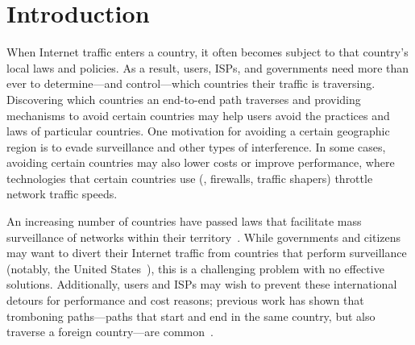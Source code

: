 \section{Introduction}
\label{intro}

When Internet traffic enters a country, it often becomes subject to that country's
local laws and policies.  As a result, users, ISPs, and governments need
more than ever to determine---and control---which countries their traffic is
traversing.  Discovering which countries an end-to-end path traverses and
providing mechanisms to avoid certain countries may help users avoid the
 practices and laws of particular countries. One motivation for avoiding a certain 
geographic region is to evade surveillance and other types of interference.  In some
cases, avoiding certain countries may also lower costs or improve performance,
where technologies that certain countries use (\eg, firewalls, traffic
shapers) throttle network traffic speeds. 

An increasing number of countries have passed laws that facilitate mass
surveillance of networks within their territory~\cite{france_surveillance,netherlands_surveillance,kazak_surveillance,uk_bill}. While governments and
citizens may want to divert their Internet traffic from countries that
perform surveillance (notably, the United States~\cite{russia_secure_internet,routing_errors,dte}), this is a challenging problem with no effective 
solutions.   Additionally, users and ISPs may wish to prevent these international detours for
performance and cost reasons; previous work has shown that tromboning
paths---paths that start and end in the same country, but also traverse a
foreign country---are common~\cite{shah2015characterizing,gupta2014peering}.

